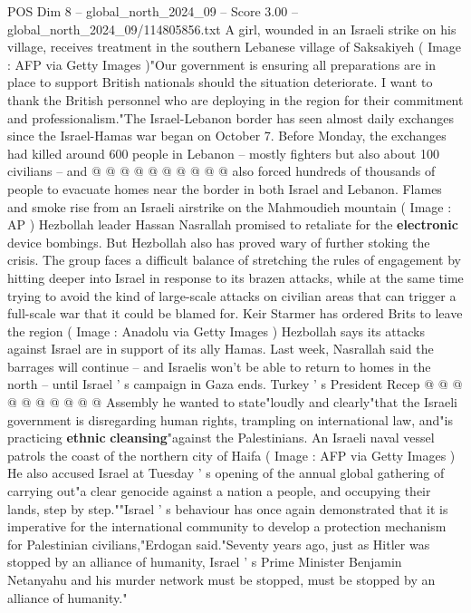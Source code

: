 \begin{textsample}{POS Dim 8 – global\_north\_2024\_09 – Score 3.00 – global\_north\_2024\_09/114805856.txt}
A girl, wounded in an Israeli strike on his village, receives treatment in the southern Lebanese village of Saksakiyeh ( Image : AFP via Getty Images )"Our government is ensuring all preparations are in place to support British nationals should the situation deteriorate.
I want to thank the British personnel who are deploying in the region for their commitment and professionalism."The Israel-Lebanon border has seen almost daily exchanges since the Israel-Hamas war began on October 7.
Before Monday, the exchanges had killed around 600 people in Lebanon -- mostly fighters but also about 100 civilians -- and @ @ @ @ @ @ @ @ @ @ also forced hundreds of thousands of people to evacuate homes near the border in both Israel and Lebanon.
Flames and smoke rise from an Israeli airstrike on the Mahmoudieh mountain ( Image : AP ) Hezbollah leader Hassan Nasrallah promised to retaliate for the \textbf{electronic} device bombings.
But Hezbollah also has proved wary of further stoking the crisis.
The group faces a difficult balance of stretching the rules of engagement by hitting deeper into Israel in response to its brazen attacks, while at the same time trying to avoid the kind of large-scale attacks on civilian areas that can trigger a full-scale war that it could be blamed for.
Keir Starmer has ordered Brits to leave the region ( Image : Anadolu via Getty Images ) Hezbollah says its attacks against Israel are in support of its ally Hamas.
Last week, Nasrallah said the barrages will continue -- and Israelis won't be able to return to homes in the north -- until Israel ' s campaign in Gaza ends.
Turkey ' s President Recep @ @ @ @ @ @ @ @ @ @ Assembly he wanted to state"loudly and clearly"that the Israeli government is disregarding human rights, trampling on international law, and"is practicing \textbf{ethnic} \textbf{cleansing}"against the Palestinians.
An Israeli naval vessel patrols the coast of the northern city of Haifa ( Image : AFP via Getty Images ) He also accused Israel at Tuesday ' s opening of the annual global gathering of carrying out"a clear genocide against a nation a people, and occupying their lands, step by step.""Israel ' s behaviour has once again demonstrated that it is imperative for the international community to develop a protection mechanism for Palestinian civilians,"Erdogan said."Seventy years ago, just as Hitler was stopped by an alliance of humanity, Israel ' s Prime Minister Benjamin Netanyahu and his murder network must be stopped, must be stopped by an alliance of humanity."

\end{textsample}
